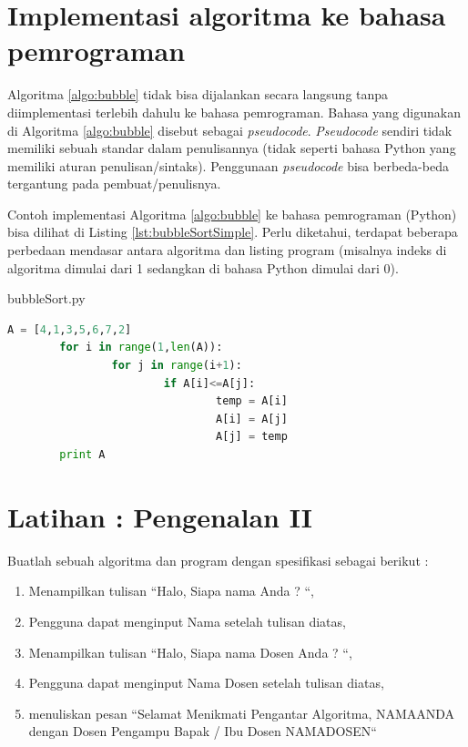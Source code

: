\section{Implementasi algoritma ke bahasa pemrograman}
Algoritma \ref{algo:bubble} tidak bisa dijalankan secara langsung tanpa diimplementasi terlebih dahulu ke bahasa pemrograman. Bahasa yang digunakan di Algoritma \ref{algo:bubble} disebut sebagai \textit{pseudocode}. \textit{Pseudocode} sendiri tidak memiliki sebuah standar dalam penulisannya (tidak seperti bahasa Python yang memiliki aturan penulisan/sintaks). Penggunaan \textit{pseudocode} bisa berbeda-beda tergantung pada pembuat/penulisnya. 

Contoh implementasi Algoritma \ref{algo:bubble} ke bahasa pemrograman (Python) bisa dilihat di Listing \ref{lst:bubbleSortSimple}. Perlu diketahui, terdapat beberapa perbedaan mendasar antara algoritma dan listing program (misalnya indeks di algoritma dimulai dari 1 sedangkan di bahasa Python dimulai dari 0). 

\begin{listprog}{bubbleSort.py}
	\label{lst:bubbleSortSimple}
	\begin{lstlisting}[language=Python]
		A = [4,1,3,5,6,7,2]
		for i in range(1,len(A)):
				for j in range(i+1):
						if A[i]<=A[j]:
								temp = A[i]
								A[i] = A[j]
								A[j] = temp
		print A
	\end{lstlisting}
\end{listprog}

\newpage
\section{Latihan : Pengenalan II}

\begin{pemrograman}
Buatlah sebuah algoritma dan program dengan spesifikasi sebagai berikut  : 
\begin{enumerate}
	\item Menampilkan tulisan ``Halo, Siapa nama Anda ? ``, 
	\item Pengguna dapat menginput Nama setelah tulisan diatas, 
	\item Menampilkan tulisan ``Halo, Siapa nama Dosen Anda ? ``, 
	\item Pengguna dapat menginput Nama Dosen setelah tulisan diatas, 
	\item menuliskan pesan ``Selamat Menikmati Pengantar Algoritma, NAMAANDA dengan Dosen Pengampu Bapak / Ibu Dosen NAMADOSEN``
\end{enumerate}
\end{pemrograman}

